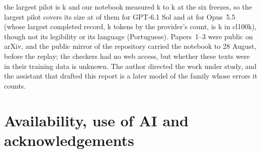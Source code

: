 \documentclass[11pt]{article}
\begin{document}
the largest pilot is \PilotTokLargeCl{}k and our notebook measured \NbTokFirst{}k to \NbTokLast{}k at the six freezes, so the largest
pilot covers its size at \NbFreezesUnderPilot{} of them for GPT-6.1 Sol and at \NbFreezesUnderPilotOpus{} for Opus~5.5 (whose largest
completed record, \PilotTokMidOpus{}k tokens by the provider's count, is \PilotTokLargeOpusCl{}k in cl100k), though not its legibility or its
language (Portuguese). Papers~1--3 were public on arXiv, and the public mirror of the repository carried the notebook to
28 August, before the replay; the checkers had no web access, but whether these texts were in their training data is unknown. The
author directed the work under study, and the assistant that drafted this report is a later model of the family whose errors it
counts.

\section{Availability, use of AI and acknowledgements}
\label{sec:avail}
\end{document}
